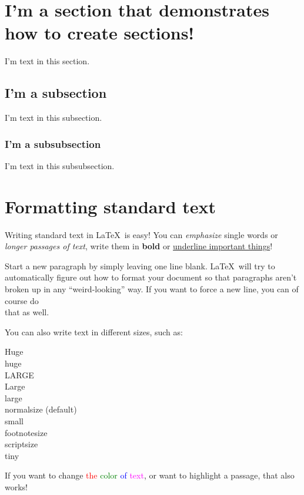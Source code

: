 \documentclass[letterus,times]{SIOpset}
\begin{document}
\section{I'm a section that demonstrates how to create sections!}
I'm text in this section.
\subsection{I'm a subsection}
I'm text in this subsection.
\subsubsection{I'm a subsubsection}
I'm text in this subsubsection.

\section{Formatting standard text}
Writing standard text in \LaTeX\ is easy! You can \emph{emphasize} single words or \emph{longer passages of text}, write them in \textbf{bold} or \underline{underline important things}!

Start a new paragraph by simply leaving one line blank. \LaTeX\ will try to automatically figure out how to format your document so that paragraphs aren't broken up in any ``weird-looking'' way. 
If you want to force a new line, you can of course do \\ that as well.

You can also write text in different sizes, such as:

{\Huge Huge}\\
{\huge huge}\\
{\LARGE LARGE}\\
{\Large Large}\\
{\large large} \\
{\normalsize normalsize (default)}\\
{\small small}\\
{\footnotesize footnotesize}\\
{\scriptsize scriptsize}\\
{\tiny tiny}

If you want to change \textcolor{red}{the} \textcolor{green}{color} \textcolor{blue}{of} \textcolor{magenta}{text}, or want to \colorbox{BurntOrange}{highlight} a passage, that also works!
\end{document}
